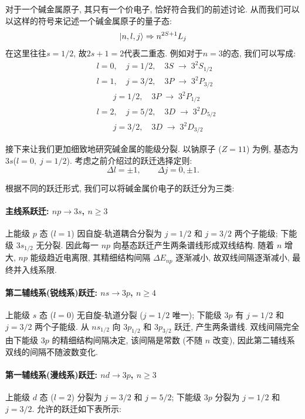 对于一个碱金属原子, 其只有一个价电子, 恰好符合我们的前述讨论. 从而我们可以以这样的符号来记述一个碱金属原子的量子态:
\[
\ket{n, l, j} \Rightarrow n^{2S+1}L_j
\]
在这里往往$s=1/2$, 故$2s+1=2$代表二重态. 例如对于$n = 3$的态, 我们可以写成:
\[
\begin{aligned}
& l = 0, \quad j = 1/2, \quad 3S \;\to\; 3^2 S_{1/2} \\
& l = 1, \quad j = 3/2, \quad 3P \;\to\; 3^2 P_{3/2} \\
& \qquad j = 1/2, \quad 3P \;\to\; 3^2 P_{1/2} \\
& l = 2, \quad j = 5/2, \quad 3D \;\to\; 3^2 D_{5/2} \\
& \qquad j = 3/2, \quad 3D \;\to\; 3^2 D_{3/2}
\end{aligned}
\]

接下来让我们更加细致地研究碱金属的能级分裂. 以钠原子 (\(Z=11\)) 为例, 基态为 \(3s\)(\(l=0, \; j=1/2\)). 考虑之前介绍过的跃迁选择定则:
\[
\Delta l = \pm 1, \qquad \Delta j = 0, \pm 1.
\]


根据不同的跃迁形式, 我们可以将碱金属价电子的跃迁分为三类:


\paragraph{主线系跃迁: \(n p \to 3s\), \(n\ge 3\)}

上能级 \(p\) 态 (\(l=1\)) 因自旋-轨道耦合分裂为 \(j=1/2\) 和 \(j=3/2\) 两个子能级; 下能级 \(3s_{1/2}\) 无分裂. 因此每一 \(n p\) 向基态跃迁产生两条谱线形成双线结构. 随着 \(n\) 增大, \(n p\) 能级趋近电离限, 其精细结构间隔 \(\Delta E_{np}\) 逐渐减小, 故双线间隔逐渐减小, 最终并入线系限.

\paragraph{第二辅线系(锐线系)跃迁: \(n s \to 3p\), \(n\ge 4\)}
上能级 \(s\) 态 (\(l=0\)) 无自旋-轨道分裂 (\(j=1/2\) 唯一); 下能级 \(3p\) 有 \(j=1/2\) 和 \(j=3/2\) 两个子能级. 从 \(n s_{1/2}\) 向 \(3p_{1/2}\) 和 \(3p_{3/2}\) 跃迁, 产生两条谱线. 双线间隔完全由下能级 \(3p\) 的精细结构间隔决定, 该间隔是常数 (不随 \(n\) 改变), 因此第二辅线系双线的间隔不随波数变化.

\paragraph{第一辅线系(漫线系)跃迁: \(n d \to 3p\), \(n\ge 3\)}
上能级 \(d\) 态 (\(l=2\)) 分裂为 \(j=3/2\) 和 \(j=5/2\); 下能级 \(3p\) 分裂为 \(j=1/2\) 和 \(j=3/2\). 允许的跃迁如下表所示:

